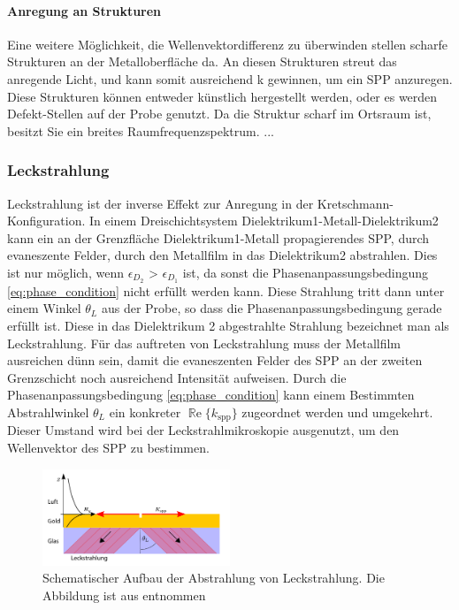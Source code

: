 \documentclass{article}
\begin{document}
			\paragraph{Anregung an Strukturen}
			Eine weitere Möglichkeit, die Wellenvektordifferenz zu überwinden stellen scharfe Strukturen an der Metalloberfläche da. An diesen Strukturen streut das anregende Licht, und kann somit ausreichend k gewinnen, um ein SPP anzuregen. Diese Strukturen können entweder künstlich hergestellt werden, oder es werden Defekt-Stellen auf der Probe genutzt. Da die Struktur scharf im Ortsraum ist, besitzt Sie ein breites Raumfrequenzspektrum.
			... 
		\subsubsection{Leckstrahlung}
		\label{sec:leakage_radiation}
			Leckstrahlung ist der inverse Effekt zur Anregung in der Kretschmann-Konfiguration. In einem Dreischichtsystem Dielektrikum1-Metall-Dielektrikum2 kann ein an der Grenzfläche Dielektrikum1-Metall propagierendes SPP, durch evaneszente Felder, durch den Metallfilm in das Dielektrikum2 abstrahlen. Dies ist nur möglich, wenn {$\epsilon_{D_2}$ > $\epsilon_{D_1}$} ist, da sonst die Phasenanpassungsbedingung \eqref{eq:phase_condition} nicht erfüllt werden kann. Diese Strahlung tritt dann unter einem Winkel $\theta_L$ aus der Probe, so dass die Phasenanpassungsbedingung gerade erfüllt ist. Diese in das Dielektrikum 2 abgestrahlte Strahlung bezeichnet man als Leckstrahlung. Für das auftreten von  Leckstrahlung muss der Metallfilm ausreichen dünn sein, damit die evaneszenten Felder des  SPP an der zweiten Grenzschicht noch ausreichend Intensität aufweisen. Durch die Phasenanpassungsbedingung \eqref{eq:phase_condition} kann einem Bestimmten Abstrahlwinkel $\theta_L$ ein konkreter $\operatorname{\mathbb{R}e}\{k_{\mathrm{spp}}\}$ zugeordnet werden und umgekehrt. Dieser Umstand wird bei der Leckstrahlmikroskopie ausgenutzt, um den Wellenvektor des SPP zu bestimmen.
				\begin{figure}[h] 
				\centering
				\includegraphics[width=0.5\textwidth]{figures/leckstrahlung.pdf}
				\caption{Schematischer Aufbau der Abstrahlung von Leckstrahlung. Die Abbildung ist aus \cite{Jaruschewski.2020} entnommen}
				\label{fig:leakage_radiation}
			\end{figure}
\end{document}
